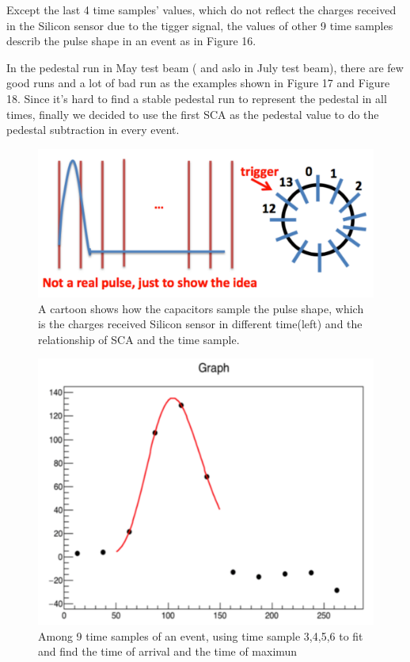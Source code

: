 \documentclass{article}
\begin{document}
Except the last 4 time samples' values, which do not reflect the charges received in the Silicon sensor due to the tigger signal, the values of other 9 time samples describ the pulse shape in an event as in Figure 16.    

In the pedestal run in May test beam ( and aslo in July test beam), there are few good runs and a lot of bad run as the examples shown in Figure 17 and Figure 18. Since it's hard to find a stable pedestal run to represent the pedestal in all times, finally we decided to use the first SCA as the pedestal value to do the pedestal subtraction in every event.  


\begin{figure}
\centering
\includegraphics[width=.7\textwidth]{figures/SCA_and_TimeSample2.pdf}
\caption{A cartoon shows how the capacitors sample the pulse shape, which is the charges received Silicon sensor in different time(left) and the relationship of SCA and the time sample.}
\label{pics:blablabla}
\end{figure}

\begin{figure}
\centering
\includegraphics[width=.7\textwidth]{figures/Shilpi_fit_TimeSample_shape.pdf}
\caption{Among 9 time samples of an event, using time sample 3,4,5,6 to fit and find the time of arrival and the time of maximun}
\label{pics:blablabla}
\end{figure}
\end{document}
